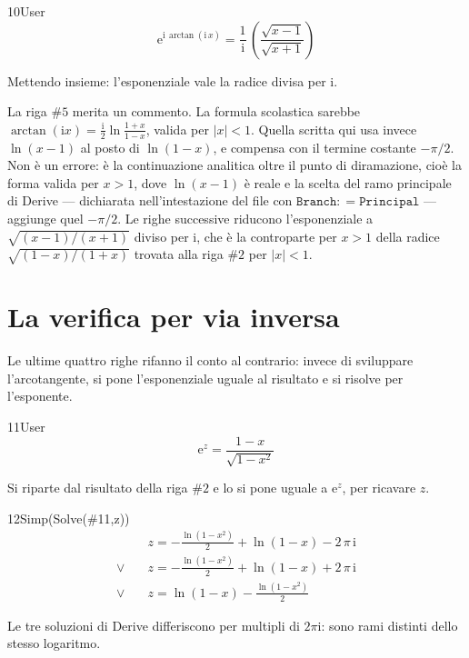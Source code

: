\begin{espr}{10}{User}{\verificata}
\[
\mathrm{e}^{\mathrm{i}\, \arctan\!\left(\mathrm{i}\, x\right)} = \frac{1}{\mathrm{i}}\, \left(\frac{\sqrt{x - 1}}{\sqrt{x + 1}}\right)
\]
\end{espr}
Mettendo insieme: l'esponenziale vale la radice divisa per $\mathrm{i}$.


La riga $\#5$ merita un commento. La formula scolastica sarebbe $\arctan(\mathrm{i}x)=\tfrac{\mathrm{i}}{2}\ln\frac{1+x}{1-x}$, valida per $|x|<1$. Quella scritta qui usa invece $\ln(x-1)$ al posto di $\ln(1-x)$, e compensa con il termine costante $-\pi/2$. Non è un errore: è la continuazione analitica oltre il punto di diramazione, cioè la forma valida per $x>1$, dove $\ln(x-1)$ è reale e la scelta del ramo principale di Derive — dichiarata nell'intestazione del file con $\mathtt{Branch{:}{=}Principal}$ — aggiunge quel $-\pi/2$. Le righe successive riducono l'esponenziale a $\sqrt{(x-1)/(x+1)}$ diviso per $\mathrm{i}$, che è la controparte per $x>1$ della radice $\sqrt{(1-x)/(1+x)}$ trovata alla riga $\#2$ per $|x|<1$.

\section{La verifica per via inversa}

Le ultime quattro righe rifanno il conto al contrario: invece di sviluppare l'arcotangente, si pone l'esponenziale uguale al risultato e si risolve per l'esponente.

\begin{espr}{11}{User}{}
\[
\mathrm{e}^{z} = \frac{1 - x}{\sqrt{1 - x^{2}}}
\]
\end{espr}
Si riparte dal risultato della riga $\#2$ e lo si pone uguale a $\mathrm{e}^z$, per ricavare $z$.

\begin{espr}{12}{Simp(Solve(\#11,z))}{}
\begin{align*}
& z = -\frac{\ln\!\left(1 - x^{2}\right)}{2} + \ln\!\left(1 - x\right) - 2\, \pi\, \mathrm{i} \\[3pt]
\lor\quad & z = -\frac{\ln\!\left(1 - x^{2}\right)}{2} + \ln\!\left(1 - x\right) + 2\, \pi\, \mathrm{i} \\[3pt]
\lor\quad & z = \ln\!\left(1 - x\right) - \frac{\ln\!\left(1 - x^{2}\right)}{2}
\end{align*}
\end{espr}
Le tre soluzioni di Derive differiscono per multipli di $2\pi\mathrm{i}$: sono rami distinti dello stesso logaritmo.


